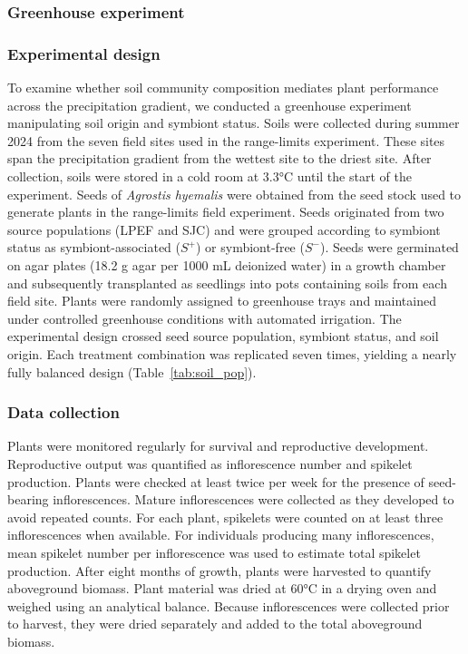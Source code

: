 \documentclass[12pt]{article}\usepackage[]{graphicx}\usepackage[dvipsnames]{xcolor}
\begin{document}
{\subsubsection {Greenhouse experiment}
\label{sec:greenhouse}
\subsubsection*{Experimental design}
To examine whether soil community composition mediates plant performance across the precipitation gradient, we conducted a greenhouse experiment manipulating soil origin and symbiont status. 
Soils were collected during summer 2024 from the seven field sites used in the range-limits experiment. These sites span the precipitation gradient from the wettest site to the driest site. 
After collection, soils were stored in a cold room at 3.3°C until the start of the experiment. 
Seeds of \textit{Agrostis hyemalis} were obtained from the seed stock used to generate plants in the range-limits field experiment. 
Seeds originated from two source populations (LPEF and SJC) and were grouped according to symbiont status as symbiont-associated ($S^{+}$) or symbiont-free ($S^{-}$). 
Seeds were germinated on agar plates (18.2 g agar per 1000 mL deionized water) in a growth chamber and subsequently transplanted as seedlings into pots containing soils from each field site. Plants were randomly assigned to greenhouse trays and maintained under controlled greenhouse conditions with automated irrigation. 
The experimental design crossed seed source population, symbiont status, and soil origin. Each treatment combination was replicated seven times, yielding a nearly fully balanced design (Table~\ref{tab:soil_pop}).

\subsubsection*{Data collection}
Plants were monitored regularly for survival and reproductive development. 
Reproductive output was quantified as inflorescence number and spikelet production. Plants were checked at least twice per week for the presence of seed-bearing inflorescences. 
Mature inflorescences were collected as they developed to avoid repeated counts. For each plant, spikelets were counted on at least three inflorescences when available. 
For individuals producing many inflorescences, mean spikelet number per inflorescence was used to estimate total spikelet production. 
After eight months of growth, plants were harvested to quantify aboveground biomass. Plant material was dried at 60°C in a drying oven and weighed using an analytical balance. 
Because inflorescences were collected prior to harvest, they were dried separately and added to the total aboveground biomass.

}
\end{document}
